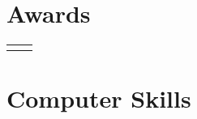 \documentclass[10pt]{article} %
\begin{document}
\begin{paracol}{2}
\begin{supertabular}{rl}
\end{supertabular}

\section{Awards}





\begin{supertabular}{rl} %
	
	
	
	
\end{supertabular}


\switchcolumn
\section{Computer Skills} 






\end{paracol}
\end{document}
